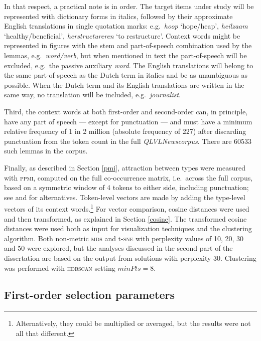 \documentclass[
]{book}
\begin{document}
In that respect, a practical note is in order. The target items under study will be represented with dictionary forms in italics, followed by their approximate English translations in single quotation marks: e.g.~\emph{hoop} `hope/heap', \emph{heilzaam} `healthy/beneficial', \emph{herstructureren} `to restructure'. Context words might be represented in figures with the stem and part-of-speech combination used by the lemmas, e.g.~\emph{word/verb}, but when mentioned in text the part-of-speech will be excluded, e.g.~the passive auxiliary \emph{word}. The English translations will belong to the same part-of-speech as the Dutch term in italics and be as unambiguous as possible. When the Dutch term and its English translations are written in the same way, no translation will be included, e.g.~\emph{journalist}.

Third, the context words at both first-order and second-order can, in principle, have any part of speech --- except for punctuation --- and must have a minimum relative frequency of 1 in 2 million (absolute frequency of 227) after discarding punctuation from the token count in the full \emph{QLVLNewscorpus}. There are 60533 such lemmas in the corpus.

Finally, as described in Section \ref{pmi}, attraction between types were measured with \textsc{ppmi}, computed on the full co-occurrence matrix, i.e.~across the full corpus, based on a symmetric window of 4 tokens to either side, including punctuation; see \textcite{turney.pantel_2010} and \textcite{kiela.clark_2014} for alternatives. Token-level vectors are made by adding the type-level vectors of its context words.\footnote{Alternatively, they could be multiplied or averaged, but the results were not all that different.}
For vector comparison, cosine distances were used and then transformed, as explained in Section \ref{cosine}. The transformed cosine distances were used both as input for visualization techniques and the clustering algorithm. Both non-metric \textsc{mds} and t-\textsc{sne} with perplexity values of 10, 20, 30 and 50 were explored, but the analyses discussed in the second part of the dissertation are based on the output from solutions with perplexity 30. Clustering was performed with \textsc{hdbscan} setting \(minPts = 8\).

\hypertarget{foc}{%
\subsection{First-order selection parameters}\label{foc}}
\end{document}
